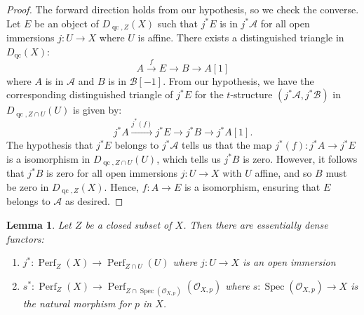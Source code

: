 \documentclass[11pt]{amsart}
\theoremstyle{plain}
\newtheorem{lemma}[theorem]{Lemma}
\theoremstyle{definition}
\numberwithin{equation}{section}
\numberwithin{theorem}{section}
\begin{document}
\begin{proof}
    The forward direction holds from our hypothesis, so we check the converse. Let $E$ be an object of $D_{\operatorname{qc},Z}(X)$ such that $j^\ast E$ is in $j^\ast \mathcal{A}$ for all open immersions $j \colon U \to X$ where $U$ is affine. There exists a distinguished triangle in $D_{\operatorname{qc}}(X)$:
    \begin{displaymath}
        A \xrightarrow{f} E \to B \to A[1]
    \end{displaymath}
    where $A$ is in $\mathcal{A}$ and $B$ is in $\mathcal{B}[-1]$. From our hypothesis, we have the corresponding distinguished triangle of $j^\ast E$ for the $t$-structure $(j^\ast \mathcal{A},j^\ast \mathcal{B})$ in $D_{\operatorname{qc}, Z\cap U}(U)$ is given by:
    \begin{displaymath}
        j^\ast A \xrightarrow{j^\ast ( f )} j^\ast E \to j^\ast B \to j^\ast A[1].
    \end{displaymath}
    The hypothesis that $j^\ast E$ belongs to $j^\ast \mathcal{A}$ tells us that the map $j^\ast (f) \colon j^\ast A \to j^\ast E$ is a isomorphism in $D_{\operatorname{qc}, Z\cap U}(U)$, which tells us $j^\ast B$ is zero. However, it follows that $j^\ast B$ is zero for all open immersions $j\colon U \to X$ with $U$ affine, and so $B$ must be zero in $D_{\operatorname{qc},Z}(X)$. Hence, $f\colon A \to E$ is a isomorphism, ensuring that $E$ belongs to $\mathcal{A}$ as desired.
\end{proof}

\begin{lemma}\label{lem:global_to_open_perfect_supported}
    Let $Z$ be a closed subset of $X$. Then there are essentially dense functors:
    \begin{enumerate}
        \item $j^\ast \colon \operatorname{Perf}_Z (X)\to \operatorname{Perf}_{Z\cap U} (U)$ where $j\colon U \to X$ is an open immersion
        \item $s^\ast \colon \operatorname{Perf}_Z (X) \to \operatorname{Perf}_{Z\cap \operatorname{Spec}(\mathcal{O}_{X,p})} (\mathcal{O}_{X,p})$ where $s\colon \operatorname{Spec}(\mathcal{O}_{X,p}) \to X$ is the natural morphism for $p$ in $X$.
    \end{enumerate}
\end{lemma}
\end{document}
